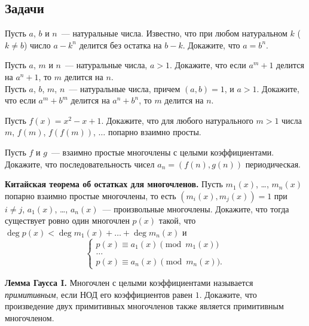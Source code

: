 \subsection*{Задачи}

\begin{problems}

\item
Пусть $a$, $b$ и $n$~--- натуральные числа.
Известно, что при любом натуральном $k$ ($k \neq b$) число $a - k^n$ делится
без остатка на $b-k$.
Докажите, что $a = b^n$.

\item
\sbp
Пусть $a$, $m$ и $n$~--- натуральные числа, $a > 1$.
Докажите, что если $a^m + 1$ делится на $a^n + 1$, то $m$ делится на $n$.
\\
\sbp
Пусть $a$, $b$, $m$, $n$~--- натуральные числа, причем $(a, b) = 1$, и
$a > 1$.
Докажите, что если $a^m + b^m$ делится на $a^n + b^n$, то $m$ делится на $n$.

\item
Пусть $f(x) = x^2 - x + 1$.
Докажите, что для любого натурального $m>1$ числа
$m$, $f(m)$, $f(f(m))$, $\ldots$
попарно взаимно просты.

\item
Пусть $f$ и $g$~--- взаимно простые многочлены с целыми коэффициентами.
Докажите, что последовательность чисел $a_n = (f(n), g(n))$ периодическая.

\item\textbf{Китайская теорема об остатках для многочленов.}
Пусть $m_1(x)$, \ldots, $m_n(x)$ попарно взаимно простые многочлены, то есть
$(m_i(x), m_j(x)) = 1$ при $i \neq j$,
$a_1(x)$, \ldots, $a_n(x)$~--- произвольные многочлены.
Докажите, что тогда существует ровно один многочлен $p(x)$ такой, что
$\deg p(x) < \deg m_1(x) + \ldots + \deg m_n(x)$ и
\[ \left\{ \begin{array}{c}
    p(x) \equiv a_1(x) \pmod{m_1(x)}
\\ \ldots \\
    p(x) \equiv a_n(x) \pmod{m_n(x)}.
\end{array} \right. \]


\item\textbf{Лемма Гаусса I.}
Многочлен с целыми коэффициентами называется \emph{примитивным}, если НОД его
коэффициентов равен $1$.
Докажите, что произведение двух примитивных многочленов также является
примитивным многочленом.


\end{problems}
